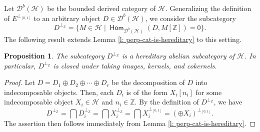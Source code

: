 \documentclass[12pt,a4paper,reqno]{amsart}
\newtheorem{proposition}[theorem]{Proposition}
\theoremstyle{definition}
\newcommand{\opname}[1]{\operatorname{\mathsf{#1}}}
\newcommand{\der}{\cd}
\newcommand{\Hom}{\opname{Hom}}
\newcommand{\cd}{{\mathcal D}}
\begin{document}
Let  $\der^b (\mathcal{H})$ be the bounded derived category of $\mathcal{H}$. Generalizing the definition of $E^{\perp_{[0, 1]}}$ to an arbitrary object $D \in \mathcal{D}^b(\mathcal{H})$, we consider the subcategory
\[
D^{\perp_{\mathbb{Z}}} = \{M \in \mathcal{H}\mid \Hom_{\der^b(\mathcal{H})}(D, M[\mathbb{Z}]) = 0 \}.
\]
The following result extends Lemma \ref{l: perp-cat-is-hereditary} to this setting.

\begin{proposition}\label{p: perp-for-presilting}
The subcategory $D^{\perp_{\mathbb{Z}}}$ is a hereditary abelian subcategory of $\mathcal{H}$. In particular, $D^{\perp_{\mathbb{Z}}}$ is closed under taking images, kernels, and cokernels.
\end{proposition}
\begin{proof}
Let $D = D_1 \oplus D_2 \oplus \cdots \oplus D_r$ be the decomposition of $D$ into indecomposable objects. Then, each $D_i$ is of the form $X_i[n_i]$ for some indecomposable object $X_i \in \mathcal{H}$ and $n_i \in \mathbb{Z}$. By the definition of $D^{\perp_{\mathbb{Z}}}$, we have
\[D^{\perp_{\mathbb{Z}}} = \bigcap D_i^{\perp_{\mathbb{Z}}} = \bigcap X_i^{\perp_{\mathbb{Z}}} = \bigcap X_i^{\perp_{[0, 1]}}=(\oplus X_i)^{\perp_{[0,1]}}.\]  The assertion then follows immediately from Lemma \ref{l: perp-cat-is-hereditary}.
\end{proof}
\end{document}
